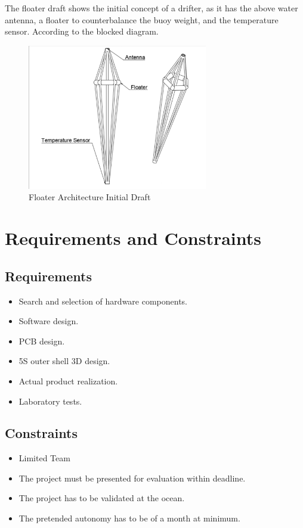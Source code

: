 The floater draft shows the initial concept of a drifter, as it has the above water 
antenna, a floater to counterbalance the buoy weight, and the temperature sensor. 
According to the blocked diagram.
\begin{figure}[H]
    \centering
    \includegraphics[width=0.7\textwidth]{images/diagrams/shell/unnamed.png}  %
    \caption{Floater Architecture Initial Draft}
    \label{fig:Floater Architecture Initial Draft}        
\end{figure}

\section{Requirements and Constraints}
\subsection{Requirements}
\begin{itemize}
    \item Search and selection of hardware components.
    \item Software design.
    \item PCB design.
    \item 5S outer shell 3D design.
    \item Actual product realization.
    \item Laboratory tests.
\end{itemize}
\subsection{Constraints}
\begin{itemize}
    \item Limited Team
    \item The project must be presented for evaluation within deadline.
    \item The project has to be validated at the ocean.
    \item The pretended autonomy has to be of a month at minimum.
\end{itemize}

